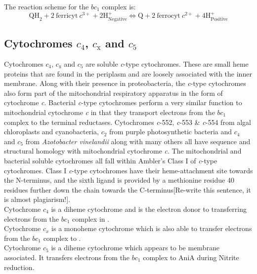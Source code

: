 The reaction scheme for the $bc_1$ complex is:
\begin{equation}
\mathrm{QH}_2 + 2 \mathrm{~ferricyt~} c^{3+} + 2\mathrm{H}^+_{\mathrm{Negative}} \Longleftrightarrow \mathrm{Q} + 2 \mathrm{~ferrocyt~} c^{2+} + 4\mathrm{H}^+_{\mathrm{Positive}}
\end{equation}

\subsection{\texorpdfstring{Cytochromes $c_\mathrm{4}$, $c_\mathrm{x}$ and $c_\mathrm{5}$}{Cytochromes c4, cx and c5}}
Cytochromes $c_\mathrm{4}$, $c_\mathrm{x}$ and $c_\mathrm{5}$ are soluble \textit{c}-type cytochromes. These are small heme proteins that are found in the periplasm and are loosely associated with the inner membrane. Along with their presence in proteobacteria, the \textit{c}-type cytochromes also form part of the mitochondrial respiratory apparatus in the form of cytochrome \textit{c}. Bacterial \textit{c}-type cytochromes perform a very similar function to mitochondrial cytochrome \textit{c} in that they transport electrons from the $bc_1$ complex to the terminal reductases. Cytochromes \textit{c}-552, \textit{c}-553 \& \textit{c}-554 from algal chloroplasts and cyanobacteria, $c_2$ from purple photosynthetic bacteria and $c_4$ and $c_5$ from \textit{Azotobacter vinelandii} along with many others all have sequence and structural homology with mitochondrial cytochrome \textit{c}\cite{Wood1983}. The mitochondrial and bacterial soluble cytochromes all fall within Ambler's Class I of \textit{c}-type cytochromes\cite{Ambler1991}.
Class I \textit{c}-type cytochromes have their heme-attachment site towards the N-terminus, and the sixth ligand is provided by a methionine residue 40 residues further down the chain towards the C-terminus\cite{Ambler1991}[Re-write this sentence, it is almost plagiarism!].\\
Cytochrome $c_4$ is a diheme cytochrome and is the electron donor to \cbbthree{} transferring electrons from the $bc_1$ complex in \Nm{}\cite{Deeudom2007,Deeudom2008,Chang2010}.\\
Cytochrome $c_x$ is a monoheme cytochrome which is also able to transfer electrons from the $bc_1$ complex to \cbbthree{}\cite{Deeudom2007,Deeudom2008}.\\
Cytochrome $c_5$ is a diheme cytochrome which appears to be membrane associated. It transfers electrons from the $bc_1$ complex to AniA during Nitrite reduction\cite{Deeudom2007,Deeudom2008}.

